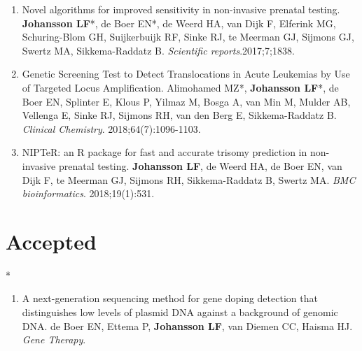 \begin{appendices}
\begin{enumerate}
	\item Novel algorithms for improved sensitivity in non-invasive prenatal testing. \textbf{Johansson LF}*, de Boer EN*, de Weerd HA, van Dijk F, Elferink MG, Schuring-Blom GH, Suijkerbuijk RF, Sinke RJ, te Meerman GJ, Sijmons GJ, Swertz MA, Sikkema-Raddatz B. \textsl{Scientific reports}.2017;7;1838.
	\item Genetic Screening Test to Detect Translocations in Acute Leukemias by Use of Targeted Locus Amplification. Alimohamed MZ*, \textbf{Johansson LF}*, de Boer EN, Splinter E, Klous P, Yilmaz M, Bosga A, van Min M, Mulder AB, Vellenga E, Sinke RJ, Sijmons RH, van den Berg E, Sikkema-Raddatz B. \textsl{Clinical Chemistry}. 2018;64(7):1096-1103.
	\item NIPTeR: an R package for fast and accurate trisomy prediction in non-invasive prenatal testing. \textbf{Johansson LF}, de Weerd HA, de Boer EN, van Dijk F, te Meerman GJ, Sijmons RH, Sikkema-Raddatz B, Swertz MA. \textsl{BMC bioinformatics}. 2018;19(1):531.
	\end{enumerate}
	
	\section{Accepted}*
	\begin{enumerate}
		\item A next-generation sequencing method for gene doping detection that distinguishes low levels of plasmid DNA against a background of genomic DNA. de Boer EN, Ettema P, \textbf{Johansson LF}, van Diemen CC, Haisma HJ. \textsl{Gene Therapy}.
	\end{enumerate}
	

\end{appendices}
